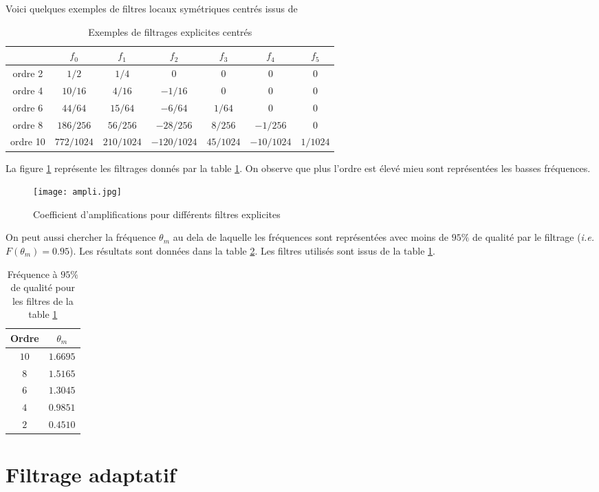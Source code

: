 \documentclass[10pt,a4paper]{article}
\begin{document}
Voici quelques exemples de filtres locaux symétriques centrés issus de \cite{Redonnet2001}


\begin{table}[ht]
\begin{center}
\begin{tabular}{c|cccccc}
& $f_0$ & $f_1$ & $f_2$ & $f_3$ & $f_4$ & $f_5$ \\
\hline
\hline
ordre 2 & $1/2$ & $1/4$ & $0$ & $0$ & $0$ & $0$\\
\hline
ordre 4 & $10/16$ & $4/16$ & $-1/16$ & $0$ & $0$ & $0$ \\
\hline
ordre 6 & $44/64$ & $15/64$ & $-6/64$ & $1/64$ & $0$ & $0$ \\
\hline
ordre 8 & $186/256$ & $56/256$ & $-28/256$ & $8/256$ & $-1/256$ & $0$ \\
\hline
ordre 10 & $772/1024$ & $210/1024$ & $-120/1024$ & $45/1024$ & $-10/1024$ & $1/1024$ \\
\end{tabular}
\caption{Exemples de filtrages explicites centrés}
\label{tab:redonnet}
\end{center}
\end{table}

La figure \ref{fig:ampli} représente les filtrages donnés par la table \ref{tab:redonnet}. On observe que plus l'ordre est élevé mieu sont représentées les basses fréquences.

\begin{figure}
\begin{center}
\texttt{[image: ampli.jpg]}
\caption{Coefficient d'amplifications pour différents filtres explicites}
\label{fig:ampli}
\end{center}
\end{figure}

On peut aussi chercher la fréquence $\theta_m$ au dela de laquelle les fréquences sont représentées avec moins de $95 \%$ de qualité par le filtrage (\textit{i.e.} $F(\theta_m)=0.95$). Les résultats sont données dans la table \ref{tab:qualite freq}. Les filtres utilisés sont issus de la table \ref{tab:redonnet}.

\begin{table}[ht]
\begin{center}
\begin{tabular}{c|c}
Ordre & $\theta_m$ \\
\hline
\hline
$10$ & $1.6695$ \\
$8$  & $1.5165$ \\
$6$  & $1.3045$ \\
$4$  & $0.9851$ \\
$2$  & $0.4510$ 
\end{tabular}
\caption{Fréquence à $95 \%$ de qualité pour les filtres de la table \ref{tab:redonnet}}
\label{tab:qualite freq}
\end{center}
\end{table}


\section{Filtrage adaptatif}






\end{document}
